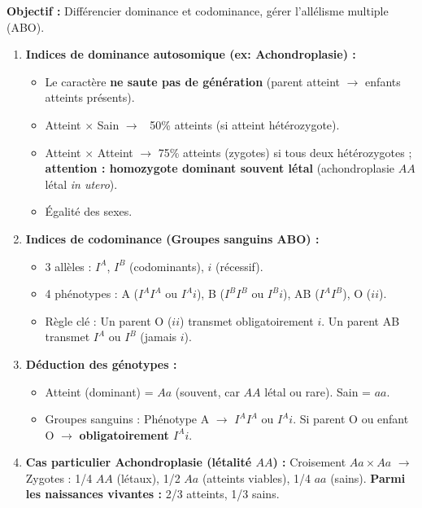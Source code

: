 \documentclass[11pt]{article}
\begin{document}
\begin{methode}
    \textbf{Objectif :} Différencier dominance et codominance, gérer l'allélisme multiple (ABO).
    \begin{enumerate}
        \item \textbf{Indices de dominance autosomique (ex: Achondroplasie) :}
              \begin{itemize}
                  \item Le caractère \textbf{ne saute pas de génération} (parent atteint $\rightarrow$ enfants atteints présents).
                  \item Atteint $\times$ Sain $\rightarrow$ ~50\% atteints (si atteint hétérozygote).
                  \item Atteint $\times$ Atteint $\rightarrow$ 75\% atteints (zygotes) si tous deux hétérozygotes ; \textbf{attention : homozygote dominant souvent létal} (achondroplasie $AA$ létal \emph{in utero}).
                  \item Égalité des sexes.
              \end{itemize}
        \item \textbf{Indices de codominance (Groupes sanguins ABO) :}
              \begin{itemize}
                  \item 3 allèles : $I^A$, $I^B$ (codominants), $i$ (récessif).
                  \item 4 phénotypes : A ($I^A I^A$ ou $I^A i$), B ($I^B I^B$ ou $I^B i$), AB ($I^A I^B$), O ($ii$).
                  \item Règle clé : Un parent O ($ii$) transmet obligatoirement $i$. Un parent AB transmet $I^A$ ou $I^B$ (jamais $i$).
              \end{itemize}
        \item \textbf{Déduction des génotypes :}
              \begin{itemize}
                  \item Atteint (dominant) = $Aa$ (souvent, car $AA$ létal ou rare). Sain = $aa$.
                  \item Groupes sanguins : Phénotype A $\rightarrow$ $I^A I^A$ ou $I^A i$. Si parent O ou enfant O $\rightarrow$ \textbf{obligatoirement $I^A i$}.
              \end{itemize}
        \item \textbf{Cas particulier Achondroplasie (létalité $AA$) :} Croisement $Aa \times Aa$ $\rightarrow$ Zygotes : 1/4 $AA$ (létaux), 1/2 $Aa$ (atteints viables), 1/4 $aa$ (sains). \textbf{Parmi les naissances vivantes :} 2/3 atteints, 1/3 sains.
    \end{enumerate}
\end{methode}
\end{document}
